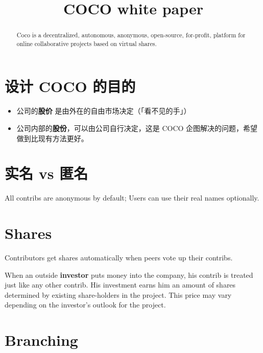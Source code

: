 \documentclass[12pt, orivec]{article}
\title{\color{blue} COCO white paper}
\newcommand{\cc}[2]{#1}
\newcommand{\cc}[2]{#2}
\begin{document}
\setlength{\parindent}{0pt}
\setlength{\parskip}{2.8ex plus0.8ex minus0.8ex}

\maketitle

\begin{abstract}
Coco is a decentralized, autonomous, anonymous, open-source, for-profit, platform for online collaborative projects based on virtual shares.
\end{abstract}

\section{\cc{设计 COCO 的目的}{What does COCO try to solve?}}

\begin{itemize}
	\item \cc{公司的\textbf{股价} 是由外在的自由市场决定（「看不见的手」）}
	{A company's \textbf{stock prices} are determined externally by the free-market (``invisible hand'')}

	\item \cc{公司内部的\textbf{股份}，可以由公司自行决定，这是 COCO 企图解决的问题，希望做到比现有方法更好。 }
	{How the company distributes its \textbf{shares} are decided internally;  This is where COCO tries to innovate.}
\end{itemize}

\section{\cc{实名 vs 匿名}{Real-name vs anonymity}}

All contribs are anonymous by default;  Users can use their real names optionally.

\section{Shares}

Contributors get shares automatically when peers vote up their contribs.

When an outside \textbf{investor} puts money into the company, his contrib is treated just like any other contrib.  His investment earns him an amount of shares determined by existing share-holders in the project.  This price may vary depending on the investor's outlook for the project.

\section{Branching}
\end{document}
